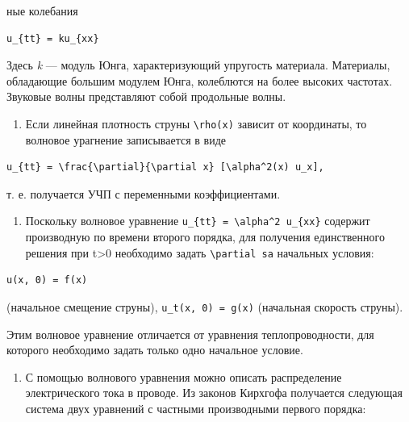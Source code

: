 \documentclass[
  ukrainian,
]{article}
\providecommand{\tightlist}{%
  \setlength{\itemsep}{0pt}\setlength{\parskip}{0pt}}
\begin{document}
ные колебания

\begin{verbatim}
u_{tt} = ku_{xx}
\end{verbatim}

Здесь \emph{k} --- модуль Юнга, характеризующий упругость материала.
Материалы, обладающие большим модулем Юнга, колеблются на более высоких
частотах. Звуковые волны представляют собой продольные волны.

\begin{enumerate}
\def\labelenumi{\arabic{enumi}.}
\setcounter{enumi}{1}
\tightlist
\item
  Если линейная плотность струны \texttt{\textbackslash{}rho(x)} зависит
  от координаты, то волновое урагнение записывается в виде
\end{enumerate}

\begin{verbatim}
u_{tt} = \frac{\partial}{\partial x} [\alpha^2(x) u_x],
\end{verbatim}

т. е. получается УЧП с переменными коэффициентами.

\begin{enumerate}
\def\labelenumi{\arabic{enumi}.}
\setcounter{enumi}{2}
\tightlist
\item
  Поскольку волновое уравнение
  \texttt{u\_\{tt\}\ =\ \textbackslash{}alpha\^{}2\ u\_\{xx\}} содержит
  производную по времени второго порядка, для получения единственного
  решения при t\textgreater0 необходимо задать
  \texttt{\textbackslash{}partial\ sa} начальных условия:
\end{enumerate}

\begin{verbatim}
u(x, 0) = f(x)
\end{verbatim}

(начальное смещение струны), \texttt{u\_t(x,\ 0)\ =\ g(x)} (начальная
скорость струны).

Этим волновое уравнение отличается от уравнения теплопроводности, для
которого необходимо задать только одно начальное условие.

\begin{enumerate}
\def\labelenumi{\arabic{enumi}.}
\setcounter{enumi}{3}
\tightlist
\item
  С помощью волнового уравнения можно описать распределение
  электрического тока в проводе. Из законов Кирхгофа получается
  следующая система двух уравнений с частными производными первого
  порядка:
\end{enumerate}
\end{document}
